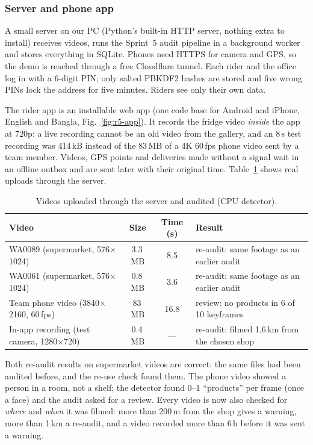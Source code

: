 \subsubsection{Server and phone app}
A small server on our PC (Python's built-in HTTP server, nothing extra to install) receives videos,
runs the Sprint~5 audit pipeline in a background worker and stores everything in SQLite. Phones need
HTTPS for camera and GPS, so the demo is reached through a free Cloudflare tunnel. Each rider and the
office log in with a 6-digit PIN; only salted PBKDF2 hashes are stored and five wrong PINs lock the
address for five minutes. Riders see only their own data.

The rider app is an installable web app (one code base for Android and iPhone, English and Bangla,
Fig.~\ref{fig:r5-app}). It records the fridge video \emph{inside} the app at 720p: a live recording
cannot be an old video from the gallery, and an 8\,s test recording was 414\,kB instead of the 83\,MB
of a 4K 60\,fps phone video sent by a team member. Videos, GPS points and deliveries made without a
signal wait in an offline outbox and are sent later with their original time.
Table~\ref{tab:r5-uploads} shows real uploads through the server.

\begin{table}[!t]
\centering
\caption{Videos uploaded through the server and audited (CPU detector).}
\label{tab:r5-uploads}
\begin{tabular}{lccl}
\hline
Video & Size & Time (s) & Result \\
\hline
WA0089 (supermarket, 576$\times$1024) & 3.3\,MB & 8.5 & re-audit: same footage as an earlier audit \\
WA0061 (supermarket, 576$\times$1024) & 0.8\,MB & 3.6 & re-audit: same footage as an earlier audit \\
Team phone video (3840$\times$2160, 60\,fps) & 83\,MB & 16.8 & review: no products in 6 of 10 keyframes \\
In-app recording (test camera, 1280$\times$720) & 0.4\,MB & --- & re-audit: filmed 1.6\,km from the chosen shop \\
\hline
\end{tabular}
\end{table}

Both re-audit results on supermarket videos are correct: the same files had been audited before, and
the re-use check found them. The phone video showed a person in a room, not a shelf; the detector found
0--1 ``products'' per frame (once a face) and the audit asked for a review. Every video is now also
checked for \emph{where} and \emph{when} it was filmed: more than 200\,m from the shop gives a warning,
more than 1\,km a re-audit, and a video recorded more than 6\,h before it was sent a warning.

